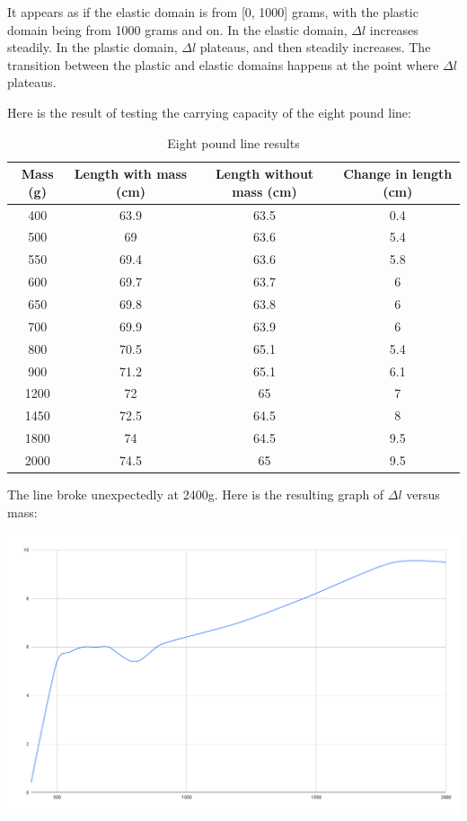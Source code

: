 \documentclass[12pt]{article}
\begin{document}
It appears as if the elastic domain is from [0, 1000] grams, with the plastic domain being from 1000 grams and on. In the elastic domain, \(\Delta l\) increases steadily. In the plastic domain, \(\Delta l\) plateaus, and then steadily increases. The transition between the plastic and elastic domains happens at the point where \(\Delta l\) plateaus.

Here is the result of testing the carrying capacity of the eight pound line:

\begin{table}[htbp]
\caption{\label{fig:eight}Eight pound line results}
\centering
\begin{tabular}{c|c|c|c}
Mass (g) & Length with mass (cm) & Length without mass (cm) & Change in length (cm)\\
\hline
400 & 63.9 & 63.5 & 0.4\\
500 & 69 & 63.6 & 5.4\\
550 & 69.4 & 63.6 & 5.8\\
600 & 69.7 & 63.7 & 6\\
650 & 69.8 & 63.8 & 6\\
700 & 69.9 & 63.9 & 6\\
800 & 70.5 & 65.1 & 5.4\\
900 & 71.2 & 65.1 & 6.1\\
1200 & 72 & 65 & 7\\
1450 & 72.5 & 64.5 & 8\\
1800 & 74 & 64.5 & 9.5\\
2000 & 74.5 & 65 & 9.5\\
\end{tabular}
\end{table}

The line broke unexpectedly at 2400g. Here is the resulting graph of \(\Delta l\) versus mass:

\begin{center}
\includegraphics[width=6in]{./eightpoundchart.png}
\end{center}
\end{document}
